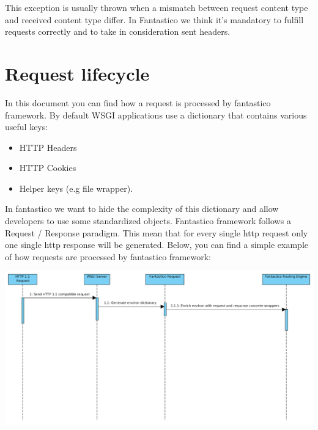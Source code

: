 \documentclass[letterpaper,10pt,english]{sphinxmanual}
\begin{document}
\begin{fulllineitems}
\label{features/exceptions:fantastico.exceptions.FantasticoContentTypeError}
This exception is usually thrown when a mismatch between request content type and received content type differ. In
Fantastico we think it's mandatory to fulfill requests correctly and to take in consideration sent headers.

\end{fulllineitems}



\section{Request lifecycle}
\label{features/request_response:request-lifecycle}\label{features/request_response::doc}
In this document you can find how a request is processed by fantastico framework. By default WSGI applications use a dictionary
that contains various useful keys:
\begin{itemize}
\item {} 
HTTP Headers

\item {} 
HTTP Cookies

\item {} 
Helper keys (e.g file wrapper).

\end{itemize}

In fantastico we want to hide the complexity of this dictionary and allow developers to use some standardized objects. Fantastico
framework follows a Request / Response paradigm. This mean that for every single http request only one single http response will
be generated. Below, you can find a simple example of how requests are processed by fantastico framework:

\includegraphics{request_response_sd.png}
\end{document}
